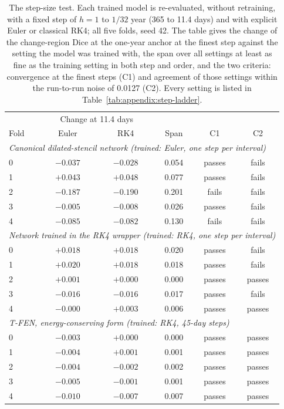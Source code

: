 \begin{table}[h]
  \centering
  \caption[The step-size test.]{%
    The step-size test. Each trained model is re-evaluated, without
    retraining, with a fixed step of $h = 1$ to $1/32$ year (365 to 11.4
    days) and with explicit Euler or classical RK4; all five folds, seed 42.
    The table gives the change of the change-region Dice at the one-year
    anchor at the finest step against the setting the model was trained
    with, the span over all settings at least as fine as the training
    setting in both step and order, and the two criteria: convergence at
    the finest steps (C1) and agreement of those settings within the
    run-to-run noise of 0.0127 (C2). Every setting is listed in
    Table~\ref{tab:appendix:step-ladder}.}
  \label{tab:experiments:swap}
  \small
  \begin{tabular}{l c c c c c}
    \toprule
    & \multicolumn{2}{c}{Change at 11.4 days} & & & \\
    Fold & Euler & RK4 & Span & C1 & C2 \\
    \midrule
    \multicolumn{6}{l}{\emph{Canonical dilated-stencil network (trained:
      Euler, one step per interval)}} \\
    0 & $-0.037$ & $-0.028$ & 0.054 & passes & fails \\
    1 & $+0.043$ & $+0.048$ & 0.077 & passes & fails \\
    2 & $-0.187$ & $-0.190$ & 0.201 & fails & fails \\
    3 & $-0.005$ & $-0.008$ & 0.026 & passes & fails \\
    4 & $-0.085$ & $-0.082$ & 0.130 & fails & fails \\
    \midrule
    \multicolumn{6}{l}{\emph{Network trained in the RK4 wrapper (trained:
      RK4, one step per interval)}} \\
    0 & $+0.018$ & $+0.018$ & 0.020 & passes & fails \\
    1 & $+0.020$ & $+0.018$ & 0.018 & passes & fails \\
    2 & $+0.001$ & $+0.000$ & 0.000 & passes & passes \\
    3 & $-0.016$ & $-0.016$ & 0.017 & passes & fails \\
    4 & $-0.000$ & $+0.003$ & 0.006 & passes & passes \\
    \midrule
    \multicolumn{6}{l}{\emph{T-FEN, energy-conserving form (trained: RK4,
      45-day steps)}} \\
    0 & $-0.003$ & $+0.000$ & 0.000 & passes & passes \\
    1 & $-0.004$ & $+0.001$ & 0.001 & passes & passes \\
    2 & $-0.004$ & $-0.002$ & 0.002 & passes & passes \\
    3 & $-0.005$ & $-0.001$ & 0.001 & passes & passes \\
    4 & $-0.010$ & $-0.007$ & 0.007 & passes & passes \\
    \bottomrule
  \end{tabular}
\end{table}


